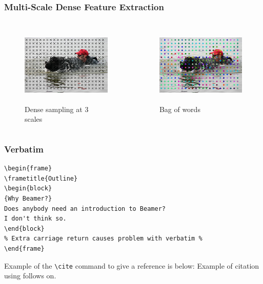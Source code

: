 \documentclass{beamer}
\begin{document}
\begin{frame}
\frametitle{Multi-Scale Dense Feature Extraction}
\begin{columns}
\begin{column}{.5\textwidth}
\begin{figure}
\includegraphics[height=1.5in]{dog_intdet}
\caption{Dense sampling at 3 scales}
\end{figure}
\end{column}
\pause
\begin{column}{.5\textwidth}
\begin{figure}
\includegraphics[height=1.5in]{dog_quantized}
\caption{Bag of words}
\end{figure}
\end{column}
\end{columns}
\end{frame}
%
\begin{frame}[fragile] %
\frametitle{Verbatim}
\begin{example}
\begin{verbatim}
\begin{frame}
\frametitle{Outline}
\begin{block}
{Why Beamer?}
Does anybody need an introduction to Beamer?
I don't think so.
\end{block}
% Extra carriage return causes problem with verbatim %
\end{frame}\end{verbatim} 
\end{example}
\end{frame}
 
\begin{frame}[fragile]  %
Example of the \verb|\cite| command to give a reference is below:
Example of citation using \cite{key1} follows on.
\end{frame}
 
\end{document}
